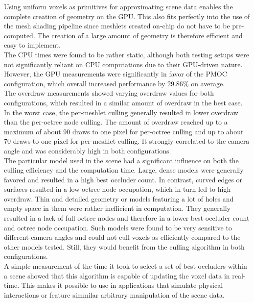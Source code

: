 \noindent
Using uniform voxels as primitives for approximating scene data enables the complete creation of geometry on the 
\ac{GPU}. This also fits perfectly into the use of the mesh shading pipeline since meshlets created on-chip do 
not have to be pre-computed. The creation of a large amount of geometry is therefore efficient and easy to 
implement. \\

\noindent
The \ac{CPU} times were found to be rather static, although both testing setups were not significantly reliant 
on \ac{CPU} computations due to their \ac{GPU}-driven nature. However, the \ac{GPU} measurements were significantly 
in favor of the \ac{PMOC} configuration, which overall increased performance by $29.86\%$ on average. \\

\noindent
The overdraw measurements showed varying overdraw values for both configurations, which resulted in a similar amount 
of overdraw in the best case. In the worst case, the per-meshlet culling generally resulted in lower overdraw than 
the per-octree node culling. The amount of overdraw reached up to a maximum of about 90 draws to one pixel for 
per-octree culling and up to about 70 draws to one pixel for per-meshlet culling. It strongly correlated to the 
camera angle and was considerably high in both configurations. \\ 

\noindent
The particular model used in the scene had a significant influence on both the culling efficiency and the computation 
time. Large, dense models were generally favored and resulted in a high best occluder count. In contrast, curved edges 
or surfaces resulted in a low octree node occupation, which in turn led to high overdraw. Thin and detailed geometry 
or models featuring a lot of holes and empty space in them were rather inefficient in computation. They generally 
resulted in a lack of full octree nodes and therefore in a lower best occluder count and octree node occupation. Such 
models were found to be very sensitive to different camera angles and could not cull voxels as efficiently compared 
to the other models tested. Still, they would benefit from the culling algorithm in both configurations. \\

\noindent
A simple measurement of the time it took to select a set of best occluders within a scene showed that this algorithm 
is capable of updating the voxel data in real-time. This makes it possible to use in applications that simulate physical 
interactions or feature simmilar arbitrary manipulation of the scene data.

